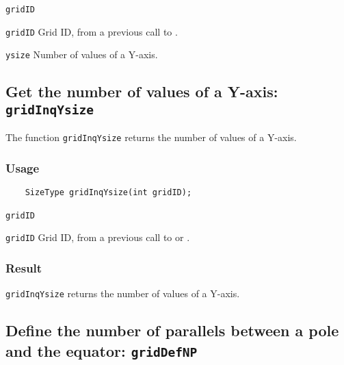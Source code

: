 \hspace*{4mm}\begin{minipage}[]{15cm}
\begin{deflist}{\texttt{gridID}\ }
\item[\texttt{gridID}]
Grid ID, from a previous call to {}.
\item[\texttt{ysize}]
Number of values of a Y-axis.

\end{deflist}
\end{minipage}


\subsection{Get the number of values of a Y-axis: \texttt{gridInqYsize}}
\label{gridInqYsize}

The function {\texttt{gridInqYsize}} returns the number of values of a Y-axis.

\subsubsection*{Usage}

\begin{verbatim}
    SizeType gridInqYsize(int gridID);
\end{verbatim}

\hspace*{4mm}\begin{minipage}[]{15cm}
\begin{deflist}{\texttt{gridID}\ }
\item[\texttt{gridID}]
Grid ID, from a previous call to {} or {}.

\end{deflist}
\end{minipage}

\subsubsection*{Result}

{\texttt{gridInqYsize}} returns the number of values of a Y-axis.



\subsection{Define the number of parallels between a pole and the equator: \texttt{gridDefNP}}
\label{gridDefNP}

